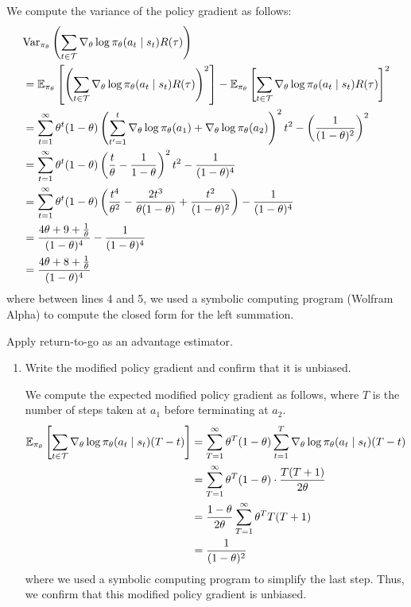 \documentclass{article}
\begin{document}
\begin{enumerate}
\begin{sol}
    We compute the variance of the policy gradient as follows:
\begin{align*}
    &\text{Var}_{\pi_\theta} \left(\sum_{t \in \mathcal{T}} \nabla_\theta \log \pi_\theta(a_t \mid s_t) R(\tau)\right) \\
    &= \mathbb{E}_{\pi_\theta} \left[\left(\sum_{t \in \mathcal{T}} \nabla_\theta \log \pi_\theta(a_t \mid s_t) R(\tau)\right)^2\right] - \mathbb{E}_{\pi_\theta}\left[\sum_{t \in \mathcal{T}} \nabla_\theta \log \pi_\theta(a_t \mid s_t) R(\tau)\right]^2\\
    &= \sum_{t=1}^\infty \theta^t (1 - \theta) \left(\sum_{t' = 1}^t \nabla_\theta \log \pi_\theta(a_1) + \nabla_\theta \log \pi_\theta (a_2)\right)^2 t^2 - \left(\frac{1}{(1 - \theta)^2}\right)^2\\
    &= \sum_{t=1}^\infty \theta^t (1 - \theta) \left(\frac{t}{\theta} - \frac{1}{1 - \theta}\right)^2 t^2  - \frac{1}{(1 - \theta)^4} \\
    &= \sum_{t=1}^\infty \theta^t (1 - \theta) \left(\frac{t^4}{\theta^2} - \frac{2t^3}{\theta (1 - \theta)} + \frac{t^2}{(1 - \theta)^2}\right)  - \frac{1}{(1 - \theta)^4} \\
    &= \frac{4\theta + 9 + \frac{1}{\theta}}{(1 - \theta)^4} - \frac{1}{(1 - \theta)^4} \\
    &= \frac{4\theta + 8 + \frac{1}{\theta}}{(1 - \theta)^4}
\end{align*}
where between lines 4 and 5, we used a symbolic computing program (Wolfram Alpha) to compute the closed form for the left summation.
\end{sol}

\newpage
{} Apply return-to-go as an advantage estimator.
\begin{enumerate}
    \item Write the modified policy gradient and confirm that it is unbiased.

    \begin{sol}
        We compute the expected modified policy gradient as follows, where $T$ is the number of steps taken at $a_1$ before terminating at $a_2$.
        \begin{align*}
            \mathbb{E}_{\pi_\theta}\left[\sum_{t \in \mathcal{T}} \nabla_\theta \log \pi_\theta(a_t \mid s_t) (T - t)\right] &= \sum_{T=1}^\infty \theta^T (1 - \theta) \sum_{t=1}^T \nabla_\theta \log \pi_\theta(a_t \mid s_t) (T - t) \\
            &= \sum_{T=1}^\infty \theta^T(1 - \theta) \cdot \frac{T(T+1)}{2 \theta} \\
            &= \frac{1 - \theta}{2 \theta} \sum_{T=1}^\infty \theta^T T(T+1) \\
            &= \frac{1}{(1 - \theta)^2}
        \end{align*}
        where we used a symbolic computing program to simplify the last step. Thus, we confirm that this modified policy gradient is unbiased.
    \end{sol}


\end{enumerate}
\end{enumerate}
\end{document}
